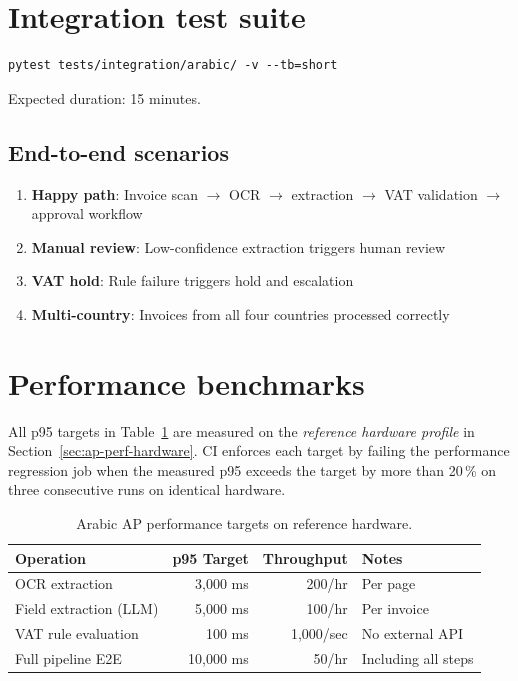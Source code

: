 \documentclass[11pt,a4paper,twoside]{report}
\begin{document}
\section{Integration test suite}

\begin{lstlisting}[basicstyle=\ttfamily\small]
pytest tests/integration/arabic/ -v --tb=short
\end{lstlisting}

Expected duration: 15 minutes.

\subsection{End-to-end scenarios}

\begin{enumerate}
  \item \textbf{Happy path}: Invoice scan $\rightarrow$ OCR $\rightarrow$ extraction
        $\rightarrow$ VAT validation $\rightarrow$ approval workflow
  \item \textbf{Manual review}: Low-confidence extraction triggers human review
  \item \textbf{VAT hold}: Rule failure triggers hold and escalation
  \item \textbf{Multi-country}: Invoices from all four countries processed correctly
\end{enumerate}

\section{Performance benchmarks}

All p95 targets in Table~\ref{tab:ap-perf-targets} are measured on the
\emph{reference hardware profile} in Section~\ref{sec:ap-perf-hardware}.
CI enforces each target by failing the performance regression job when
the measured p95 exceeds the target by more than 20\,\% on three
consecutive runs on identical hardware.

\begin{table}[htbp]
\centering
\caption{Arabic AP performance targets on reference hardware.}
\label{tab:ap-perf-targets}
\footnotesize
\begin{tabularx}{\linewidth}{@{}l r r X@{}}
\toprule
\textbf{Operation} & \textbf{p95 Target} & \textbf{Throughput} & \textbf{Notes} \\ \midrule
OCR extraction & 3,000 ms & 200/hr & Per page \\
Field extraction (LLM) & 5,000 ms & 100/hr & Per invoice \\
VAT rule evaluation & 100 ms & 1,000/sec & No external API \\
Full pipeline E2E & 10,000 ms & 50/hr & Including all steps \\
\bottomrule
\end{tabularx}
\end{table}
\end{document}
